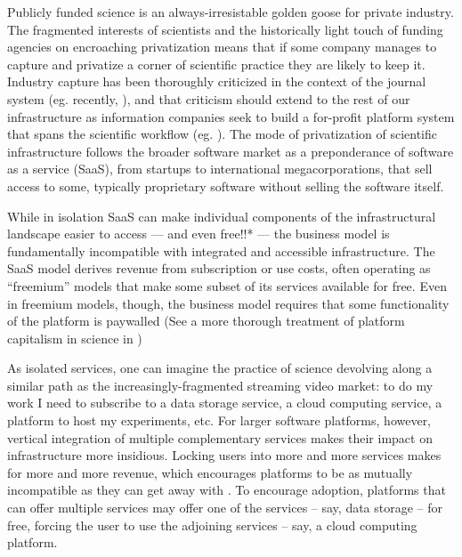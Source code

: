 \documentclass[10pt]{article}
\begin{document}
\begin{multicols}{2}
Publicly funded science is an always-irresistable golden goose for
private industry. The fragmented interests of scientists and the
historically light touch of funding agencies on encroaching
privatization means that if some company manages to capture and
privatize a corner of scientific practice they are likely to keep it.
Industry capture has been thoroughly criticized in the context of the
journal system (eg. recently, \cite{brembsReplacingAcademicJournals2021} ), and that criticism should
extend to the rest of our infrastructure as information companies seek
to build a for-profit platform system that spans the scientific workflow
(eg. \cite{ElsevierSevenBridges2017} ). The mode of privatization
of scientific infrastructure follows the broader software market as a
preponderance of software as a service (SaaS), from startups to
international megacorporations, that sell access to some, typically
proprietary software without selling the software itself.

While in isolation SaaS can make individual components of the
infrastructural landscape easier to access --- and even free!!* --- the
business model is fundamentally incompatible with integrated and
accessible infrastructure. The SaaS model derives revenue from
subscription or use costs, often operating as ``freemium'' models that
make some subset of its services available for free. Even in freemium
models, though, the business model requires that some functionality of
the platform is paywalled (See a more thorough treatment of platform
capitalism in science in \cite{mirowskiFutureOpenScience2018} )

As isolated services, one can imagine the practice of science devolving
along a similar path as the increasingly-fragmented streaming video
market: to do my work I need to subscribe to a data storage service, a
cloud computing service, a platform to host my experiments, etc. For
larger software platforms, however, vertical integration of multiple
complementary services makes their impact on infrastructure more
insidious. Locking users into more and more services makes for more and
more revenue, which encourages platforms to be as mutually incompatible
as they can get away with \cite{macinnesCompatibilityStandardsMonopoly2005} . To encourage adoption,
platforms that can offer multiple services may offer one of the services
-- say, data storage -- for free, forcing the user to use the adjoining
services -- say, a cloud computing platform.


\end{multicols}
\end{document}
